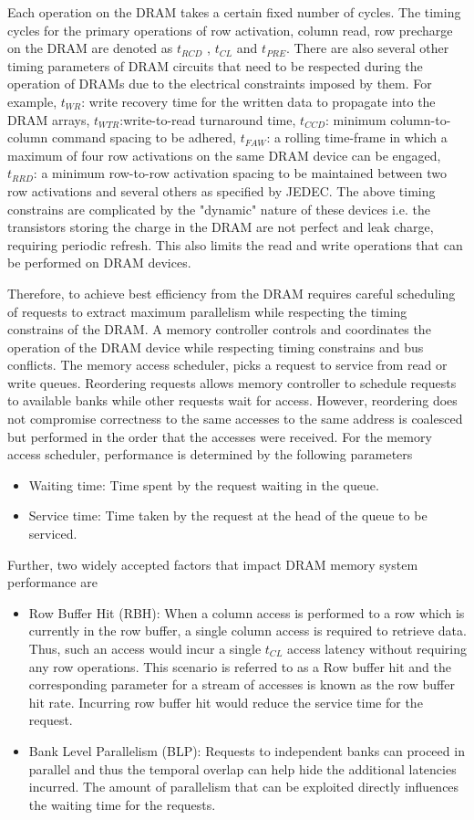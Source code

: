 \par Each operation on the DRAM takes a certain fixed number of cycles. The timing cycles for the primary operations of row activation, column read, row precharge on the DRAM are denoted as $t_{RCD}$ , $t_{CL}$ and $t_{PRE}$. There are also several other timing parameters of DRAM circuits that need to be respected during the operation of DRAMs due to the electrical constraints imposed by them. For example, $t_{WR}$: write recovery time for the written data to propagate into the DRAM arrays, $t_{WTR}$:write-to-read turnaround time, $t_{CCD}$: minimum column-to-column command spacing to be adhered, $t_{FAW}$: a rolling time-frame in which a maximum of four row activations on the same DRAM device can be engaged, $t_{RRD}$: a minimum row-to-row activation spacing to be maintained between two row activations and several others as specified by JEDEC. The above timing constrains are complicated by the "dynamic" nature of these devices i.e. the transistors storing the charge in the DRAM are not perfect and leak charge, requiring periodic refresh. This also limits the read and write operations that can be performed on DRAM devices.
\par Therefore, to achieve best efficiency from the DRAM requires careful scheduling of requests to extract maximum parallelism while respecting the timing constrains of the DRAM. A memory controller controls and coordinates the operation of the DRAM device while respecting timing constrains and bus conflicts. The memory access scheduler, picks a request to service from read or write queues. Reordering requests allows memory controller to schedule requests to available banks while other requests wait for access. However, reordering does not compromise correctness to the same accesses to the same address is coalesced but performed in the order that the accesses were received. For the memory access scheduler, performance is determined by the following parameters
\begin{itemize}
	\item Waiting time: Time spent by the request waiting in the queue.
	\item Service time: Time taken by the request at the head of the queue to be serviced.
\end{itemize}
Further, two widely accepted factors that impact DRAM memory system performance are
\begin{itemize}
	\item Row Buffer Hit (RBH): When a column access is performed to a row which is currently in the row buffer, a single column access is required to retrieve data. Thus, such an access would incur a single $t_{CL}$ access latency without requiring any row operations. This scenario is referred to as a Row buffer hit and the corresponding parameter for a stream of accesses is known as the row buffer hit rate. Incurring row buffer hit would reduce the service time for the request. 
	\item Bank Level Parallelism (BLP): Requests to independent banks can proceed in parallel and thus the temporal overlap can help hide the additional latencies incurred. The amount of parallelism that can be exploited directly influences the waiting time for the requests.
\end{itemize}
